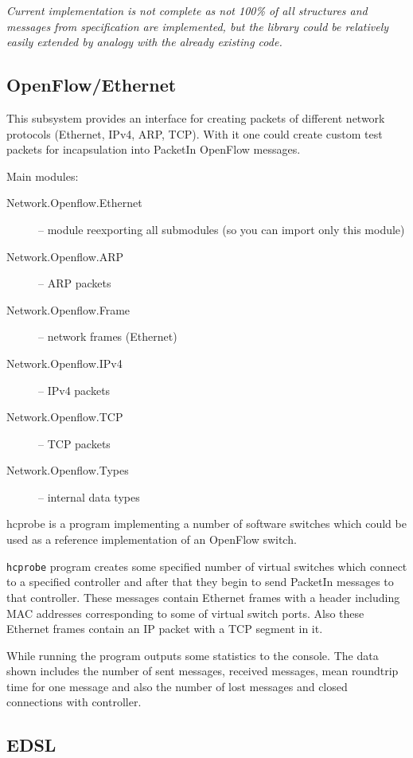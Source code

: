 \documentclass[9pt,a4paper]{article}
\begin{document}
\emph{Current implementation is not complete as not 100\% of all
  structures and messages from specification are implemented, but the library
  could be relatively easily extended by analogy with the already
  existing code.}

\subsection{OpenFlow/Ethernet}

This subsystem provides an interface for creating packets of different
network protocols (Ethernet, IPv4, ARP, TCP). With it one could
create custom test packets for incapsulation into PacketIn OpenFlow
messages.

Main modules:

\begin{description}
  \item[Network.Openflow.Ethernet] -- module reexporting all
    submodules (so you can import only this module)
  \item[Network.Openflow.ARP]      -- ARP packets
  \item[Network.Openflow.Frame]    -- network frames (Ethernet)
  \item[Network.Openflow.IPv4]     -- IPv4 packets
  \item[Network.Openflow.TCP]      -- TCP packets
  \item[Network.Openflow.Types]    -- internal data types
\end{description}

hcprobe is a program implementing a number of software switches
which could be used as a reference implementation of an OpenFlow
switch.

\texttt{hcprobe} program creates some specified number of virtual
switches which connect to a specified controller and after that they
begin to send PacketIn messages to that controller. These messages
contain Ethernet frames with a header including MAC addresses
corresponding to some of virtual switch ports. Also these Ethernet
frames contain an IP packet with a TCP segment in it.

While running the program outputs some statistics to the console. The data
shown includes the number of sent messages, received messages, mean
roundtrip time for one message and also the number of lost messages and
closed connections with controller.

\subsection{EDSL}
\end{document}
